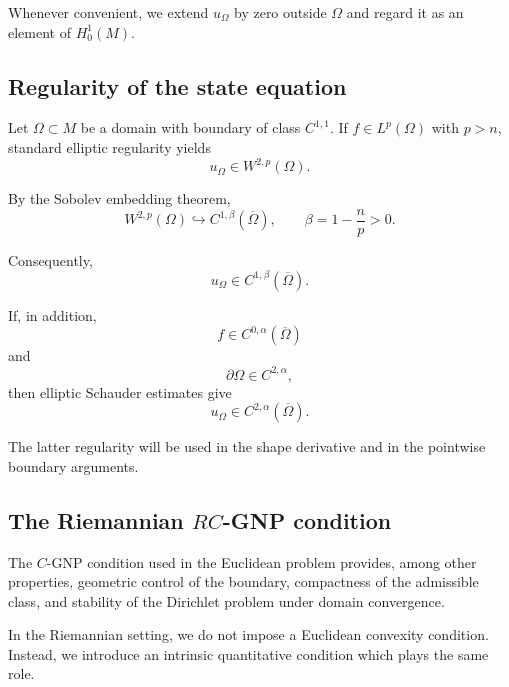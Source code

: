 \documentclass{article}
\begin{document}
Whenever convenient, we extend $u_\Omega$ by zero outside $\Omega$ and
regard it as an element of $H_0^1(M)$.

\subsection{Regularity of the state equation}
\label{subsec:state-regularity}

Let $\Omega\subset M$ be a domain with boundary of class
$C^{1,1}$. If $f\in L^p(\Omega)$ with $p>n$, standard elliptic
regularity yields
\[
u_\Omega\in W^{2,p}(\Omega).
\]

By the Sobolev embedding theorem,
\[
W^{2,p}(\Omega)
\hookrightarrow
C^{1,\beta}(\overline{\Omega}),
\qquad
\beta=1-\frac np>0.
\]

Consequently,
\begin{equation}
u_\Omega\in C^{1,\beta}(\overline{\Omega}).
\label{eq:u-C1beta}
\end{equation}

If, in addition,
\[
f\in C^{0,\alpha}(\overline{\Omega})
\]
and
\[
\partial\Omega\in C^{2,\alpha},
\]
then elliptic Schauder estimates give
\begin{equation}
u_\Omega\in C^{2,\alpha}(\overline{\Omega}).
\label{eq:u-C2alpha}
\end{equation}

The latter regularity will be used in the shape derivative and in the
pointwise boundary arguments.

\subsection{The Riemannian $RC$-GNP condition}
\label{subsec:RC-GNP}

The $C$-GNP condition used in the Euclidean problem provides, among
other properties, geometric control of the boundary, compactness of
the admissible class, and stability of the Dirichlet problem under
domain convergence.

In the Riemannian setting, we do not impose a Euclidean convexity
condition. Instead, we introduce an intrinsic quantitative condition
which plays the same role.
\end{document}
